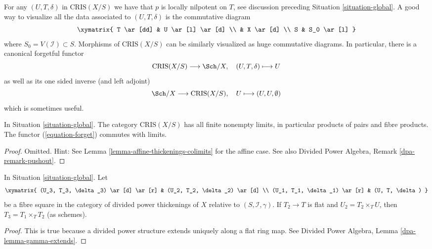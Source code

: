 \noindent
For any $(U, T, \delta)$ in $\text{CRIS}(X/S)$
we have that $p$ is locally nilpotent on $T$, see discussion preceding
Situation \ref{situation-global}.
A good way to visualize all the data associated to $(U, T, \delta)$
is the commutative diagram
$$
\xymatrix{
T \ar[dd] & U \ar[l] \ar[d] \\
& X \ar[d] \\
S & S_0 \ar[l]
}
$$
where $S_0 = V(\mathcal{I}) \subset S$. Morphisms of $\text{CRIS}(X/S)$
can be similarly visualized as huge commutative diagrams. In particular,
there is a canonical forgetful functor
\begin{equation}
\label{equation-forget}
\text{CRIS}(X/S) \longrightarrow \Sch/X,\quad
(U, T, \delta) \longmapsto U
\end{equation}
as well as its one sided inverse (and left adjoint)
\begin{equation}
\label{equation-endow-trivial}
\Sch/X \longrightarrow \text{CRIS}(X/S),\quad
U \longmapsto (U, U, \emptyset)
\end{equation}
which is sometimes useful.

\begin{lemma}
\label{lemma-divided-power-thickening-fibre-products}
In Situation \ref{situation-global}.
The category $\text{CRIS}(X/S)$ has all finite nonempty limits,
in particular products of pairs and fibre products.
The functor (\ref{equation-forget}) commutes with limits.
\end{lemma}

\begin{proof}
Omitted. Hint: See Lemma \ref{lemma-affine-thickenings-colimits}
for the affine case. See also
Divided Power Algebra, Remark \ref{dpa-remark-pushout}.
\end{proof}

\begin{lemma}
\label{lemma-divided-power-thickening-base-change-flat}
In Situation \ref{situation-global}. Let
$$
\xymatrix{
(U_3, T_3, \delta_3) \ar[d] \ar[r] & (U_2, T_2, \delta_2) \ar[d] \\
(U_1, T_1, \delta_1) \ar[r] & (U, T, \delta)
}
$$
be a fibre square in the category of divided power thickenings of
$X$ relative to $(S, \mathcal{I}, \gamma)$. If $T_2 \to T$ is
flat and $U_2 = T_2 \times_T U$, then $T_3 = T_1 \times_T T_2$ (as schemes).
\end{lemma}

\begin{proof}
This is true because a divided power structure extends uniquely
along a flat ring map. See
Divided Power Algebra, Lemma \ref{dpa-lemma-gamma-extends}.
\end{proof}

